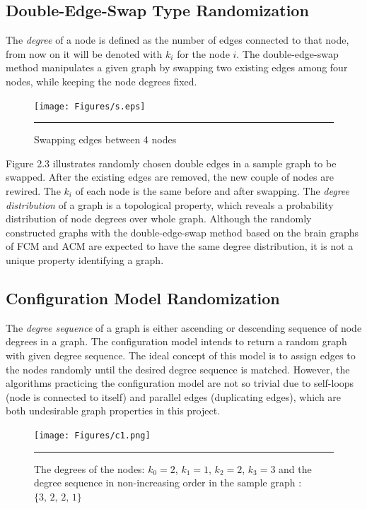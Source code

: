 \subsection{Double-Edge-Swap Type Randomization}

The \textit{degree} of a node is defined as the number of edges connected to that node, from now on it will be denoted with $k_i$ for the node $i$. The double-edge-swap method manipulates a given graph by swapping two existing edges among four nodes, while keeping the node degrees fixed. 


\begin{figure}[htbp]
  \centering
	\texttt{[image: Figures/s.eps]}  
    \rule{35em}{0.5pt}
  \caption[Double-Edge-Swap Example]{Swapping edges between 4 nodes}
  \label{fig:Double-Edge-Swap Example}
\end{figure}

Figure 2.3 illustrates randomly chosen double edges in a sample graph to be swapped. After the existing edges are removed, the new couple of nodes are rewired. The $k_i$ of each node is the same before and after swapping. The \textit{degree distribution} of a graph is a topological property, which reveals a probability distribution of node degrees over whole graph. Although the randomly constructed graphs with the double-edge-swap method based on the brain graphs of FCM and ACM are expected to have the same degree distribution, it is not a unique property identifying a graph.

\subsection{Configuration Model Randomization}

The \textit{degree sequence} of a graph is either ascending or descending sequence of node degrees in a graph. The configuration model intends to return a random graph with given degree sequence. The ideal concept of this model is to assign edges to the nodes randomly until the desired degree sequence is matched. However, the algorithms practicing the configuration model are not so trivial due to self-loops (node is connected to itself) and parallel edges (duplicating edges), which are both undesirable graph properties in this project. 

\begin{figure}[htbp]
  \centering
	\texttt{[image: Figures/c1.png]}  
    \rule{35em}{0.5pt}
    \caption[Degree Sequence Definition]{The degrees of the nodes: $k_0 = 2$, $k_1 =1$, $k_2=2$, $k_3=3$ and the degree sequence in non-increasing order in the sample graph : $\{3,\,2,\,2,\,1\}$}
  \label{fig:Degree Sequence Definition}
\end{figure}

